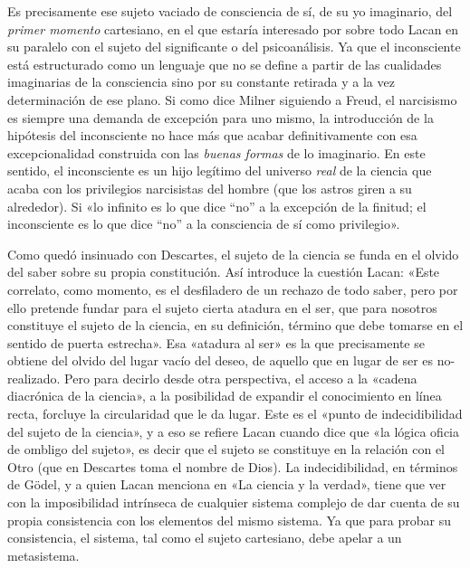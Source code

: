Es precisamente ese sujeto vaciado de consciencia de sí, de su yo imaginario, del \emph{primer momento} cartesiano, en el que estaría interesado por sobre todo Lacan en su paralelo con el sujeto del significante o del psicoanálisis. Ya que el inconsciente está estructurado como un lenguaje que no se define a partir de las cualidades imaginarias de la consciencia sino por su constante retirada y a la vez determinación de ese plano. Si como dice Milner siguiendo a Freud, el narcisismo es siempre una demanda de excepción para uno mismo, la introducción de la hipótesis del inconsciente no hace más que acabar definitivamente con esa excepcionalidad construida con las \emph{buenas formas} de lo imaginario. En este sentido, el inconsciente es un hijo legítimo del universo \emph{real} de la ciencia que acaba con los privilegios narcisistas del hombre (que los astros giren a su alrededor). Si «lo infinito es lo que dice ``no'' a la excepción de la finitud; el inconsciente es lo que dice ``no'' a la consciencia de sí como privilegio».

Como quedó insinuado con Descartes, el sujeto de la ciencia se funda en el olvido del saber sobre su propia constitución. Así introduce la cuestión Lacan: «Este correlato, como momento, es el desfiladero de un rechazo de todo saber, pero por ello pretende fundar para el sujeto cierta atadura en el ser, que para nosotros constituye el sujeto de la ciencia, en su definición, término que debe tomarse en el sentido de puerta estrecha». Esa «atadura al ser» es la que precisamente se obtiene del olvido del lugar vacío del deseo, de aquello que en lugar de ser es no-realizado. Pero para decirlo desde otra perspectiva, el acceso a la «cadena diacrónica de la ciencia», a la posibilidad de expandir el conocimiento en línea recta, forcluye la circularidad que le da lugar. Este es el «punto de indecidibilidad del sujeto de la ciencia», y a eso se refiere Lacan cuando dice que «la lógica oficia de ombligo del sujeto», es decir que el sujeto se constituye en la relación con el Otro (que en Descartes toma el nombre de Dios). La indecidibilidad, en términos de Gödel, y a quien Lacan menciona en «La ciencia y la verdad», tiene que ver con la imposibilidad intrínseca de cualquier sistema complejo de dar cuenta de su propia consistencia con los elementos del mismo sistema. Ya que para probar su consistencia, el sistema, tal como el sujeto cartesiano, debe apelar a un metasistema.

